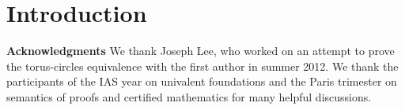 \documentclass[10pt, conference, compsocconf]{drl-common/IEEEtran}
\begin{document}
\section{Introduction}










\medskip

\textbf{Acknowledgments} We thank Joseph Lee, who worked on an attempt
to prove the torus-circles equivalence with the first author in summer
2012.  We thank the participants of the IAS year on univalent
foundations and the Paris trimester on semantics of proofs and certified
mathematics for many helpful discussions.



{ \small


}
\end{document}
